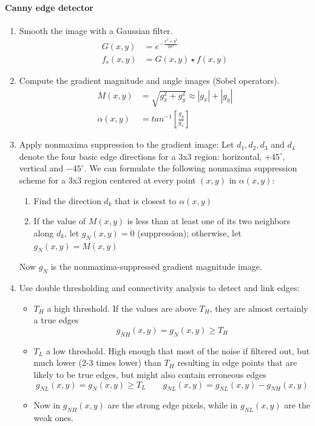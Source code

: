 \paragraph{Canny edge detector}
\begin{enumerate}
	\item Smooth the image with a Gaussian filter.
		\begin{align*}
			G(x,y)	&= e^{-\frac{x^2+y^2}{2\sigma^2}} \\
			f_s(x,y)&=G(x,y)\star f(x,y)
		\end{align*}
	\item Compute the gradient magnitude and angle images (Sobel operators).
		\begin{align*}
			M(x,y) 		&= \sqrt{g_x^2+g_y^2} \approx |g_x| + |g_y| \\
			\alpha(x,y)	&= tan^{-1}\left[\frac{g_y}{g_x}\right]
		\end{align*}
	\item Apply nonmaxima suppression to the gradient image:
		Let $d_1, d_2, d_3$ and $d_4$ denote the four basic edge directions for a 3x3 region: horizontal, $+45^\circ$, vertical and $-45^\circ$.
		We can formulate the following nonmaxima suppression scheme for a 3x3 region centered at every point $(x,y)$ in $\alpha(x,y)$:
		\begin{enumerate}
			\item Find the direction $d_k$ that is closest to $\alpha(x,y)$
			\item If the value of $M(x,y)$ is less than at least one of its two neighbors along $d_k$, let $g_N(x,y) = 0$ (suppression); otherwise, let $g_N(x,y) = M(x,y)$
		\end{enumerate}
		Now $g_N$ is the nonmaxima-suppressed gradient magnitude image.
	\item Use double thresholding and connectivity analysis to detect and link edges:
		\begin{itemize}
			\item $T_H$ a high threshold. If the values are above $T_H$, they are almost certainly a true edges
				\[
					g_{NH}(x,y) = g_N(x,y) \geq T_H
				\]
			\item $T_L$ a low threshold. High enough that most of the noise if filtered out, but much lower (2-3 times lower) than $T_H$ resulting in edge points that are likely to be true edges, but might also contain erroneous edges
				\[
					g_{NL}(x,y) = g_N(x,y) \geq T_L \qquad g_{NL}(x,y) = g_{NL}(x,y) - g_{NH}(x,y)
				\]
			\item Now in $g_{NH}(x,y)$ are the strong edge pixels, while in $g_{NL}(x,y)$ are the weak ones.

\end{itemize}
\end{enumerate}
